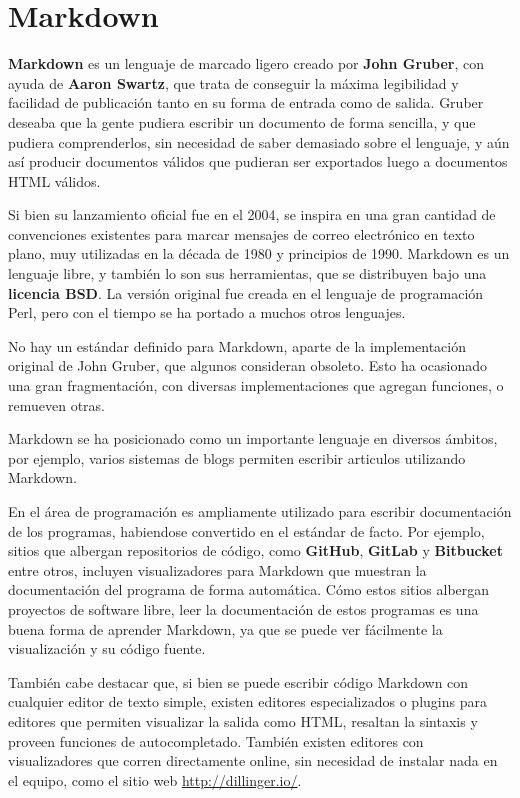 
\chapter{Markdown}
\label{Markdown}

\textbf{Markdown} es un lenguaje de marcado ligero creado por \textbf{John Gruber},
con ayuda de \textbf{Aaron Swartz}, que trata de conseguir la máxima legibilidad
y facilidad de publicación tanto en su forma de entrada como de salida. Gruber
deseaba que la gente pudiera escribir un documento de forma sencilla, y que
pudiera comprenderlos, sin necesidad de saber demasiado sobre el lenguaje, y
aún así producir documentos válidos que pudieran ser exportados luego a documentos
HTML válidos.

Si bien su lanzamiento oficial fue en el 2004, se inspira en una gran cantidad
de convenciones existentes para marcar mensajes de correo electrónico en texto
plano, muy utilizadas en la década de 1980 y principios de 1990. Markdown es un
lenguaje libre, y también lo son sus herramientas, que se distribuyen bajo una
\textbf{licencia BSD}. La versión original fue creada en el lenguaje de
programación Perl, pero con el tiempo se ha portado a muchos otros lenguajes.

No hay un estándar definido para Markdown, aparte de la implementación original
de John Gruber, que algunos consideran obsoleto. Esto ha ocasionado una gran
fragmentación, con diversas implementaciones que agregan funciones, o remueven
otras.

Markdown se ha posicionado como un importante lenguaje en diversos ámbitos, por
ejemplo, varios sistemas de blogs permiten escribir articulos utilizando
Markdown.

En el área de programación es ampliamente utilizado para escribir documentación
de los programas, habiendose convertido en el estándar de facto. Por ejemplo,
sitios que albergan repositorios de código, como \textbf{GitHub}, \textbf{GitLab}
y \textbf{Bitbucket} entre otros, incluyen visualizadores para Markdown que
muestran la documentación del programa de forma automática. Cómo estos sitios
albergan proyectos de software libre, leer la documentación de estos programas
es una buena forma de aprender Markdown, ya que se puede ver fácilmente la
visualización y su código fuente.

También cabe destacar que, si bien se puede escribir código Markdown con cualquier
editor de texto simple, existen editores especializados o plugins para editores
que permiten visualizar la salida como HTML, resaltan la sintaxis y proveen
funciones de autocompletado. También existen editores con visualizadores que
corren directamente online, sin necesidad de instalar nada en el equipo,
como el sitio web \href{http://dillinger.io/}{http://dillinger.io/}.

